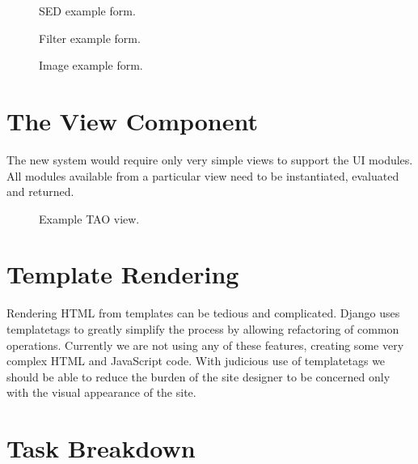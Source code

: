 \documentclass[12pt]{article}
\begin{document}
\begin{figure}[H]

\caption{SED example form.}
\end{figure}

\begin{figure}[H]

\caption{Filter example form.}
\end{figure}

\begin{figure}[H]

\caption{Image example form.}
\end{figure}

\section{The View Component}

The new system would require only very simple views to support the UI modules. All modules
available from a particular view need to be instantiated, evaluated and returned.

\begin{figure}[H]

\caption{Example TAO view.}
\end{figure}

\section{Template Rendering}

Rendering HTML from templates can be tedious and complicated. Django uses templatetags to greatly
simplify the process by allowing refactoring of common operations. Currently we are not using any
of these features, creating some very complex HTML and JavaScript code. With judicious use of
templatetags we should be able to reduce the burden of the site designer to be concerned only
with the visual appearance of the site.

\section{Task Breakdown}
\end{document}
